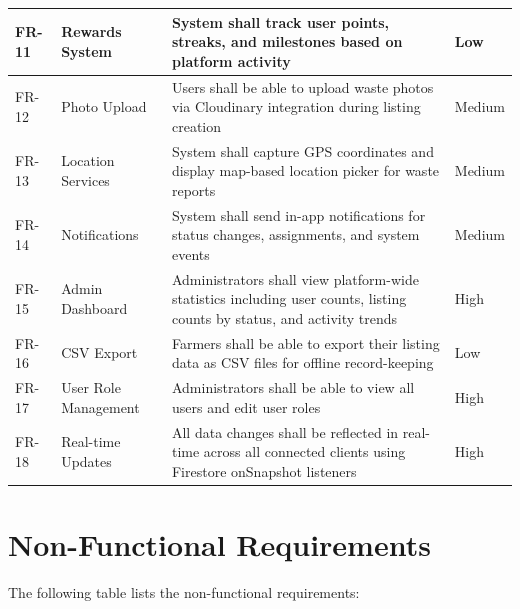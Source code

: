 \documentclass[a4paper,12pt,oneside]{report}
\begin{document}
\begin{longtable}{|p{1cm}|p{3.5cm}|p{7cm}|p{1.5cm}|}
\hline
FR-11 & Rewards System & System shall track user points, streaks, and milestones based on platform activity & Low \\
\hline
FR-12 & Photo Upload & Users shall be able to upload waste photos via Cloudinary integration during listing creation & Medium \\
\hline
FR-13 & Location Services & System shall capture GPS coordinates and display map-based location picker for waste reports & Medium \\
\hline
FR-14 & Notifications & System shall send in-app notifications for status changes, assignments, and system events & Medium \\
\hline
FR-15 & Admin Dashboard & Administrators shall view platform-wide statistics including user counts, listing counts by status, and activity trends & High \\
\hline
FR-16 & CSV Export & Farmers shall be able to export their listing data as CSV files for offline record-keeping & Low \\
\hline
FR-17 & User Role Management & Administrators shall be able to view all users and edit user roles & High \\
\hline
FR-18 & Real-time Updates & All data changes shall be reflected in real-time across all connected clients using Firestore onSnapshot listeners & High \\
\hline
\end{longtable}

\section{Non-Functional Requirements}

\noindent The following table lists the non-functional requirements:
\end{document}
